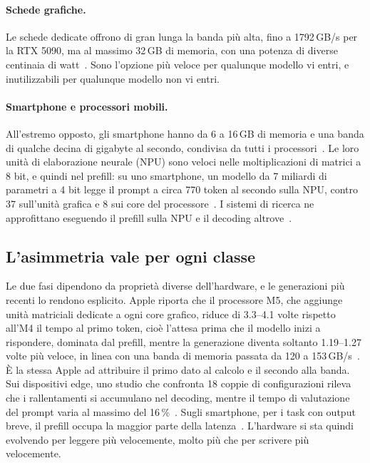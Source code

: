 \paragraph{Schede grafiche.} Le schede dedicate offrono di gran lunga la banda più alta, fino a 1792\,GB/s per la RTX
5090, ma al massimo 32\,GB di memoria, con una potenza di diverse centinaia di watt~\cite{nvidia2026geforce}. Sono
l'opzione più veloce per qualunque modello vi entri, e inutilizzabili per qualunque modello non vi entri.

\paragraph{Smartphone e processori mobili.} All'estremo opposto, gli smartphone hanno da 6 a 16\,GB di memoria e una
banda di qualche decina di gigabyte al secondo, condivisa da tutti i processori~\cite{li2025collaborative,xue2024powerinfer2}.
Le loro unità di elaborazione neurale (NPU) sono veloci nelle moltiplicazioni di matrici a 8 bit, e quindi nel prefill:
su uno smartphone, un modello da 7 miliardi di parametri a 4 bit legge il prompt a circa 770 token al secondo sulla NPU,
contro 37 sull'unità grafica e 8 sui core del processore~\cite{xue2024powerinfer2}. I sistemi di ricerca ne approfittano
eseguendo il prefill sulla NPU e il decoding altrove~\cite{xu2025npu}.

\subsection{L'asimmetria vale per ogni classe}
\label{sec:local-asymmetry}

Le due fasi dipendono da proprietà diverse dell'hardware, e le generazioni più recenti lo rendono esplicito. Apple
riporta che il processore M5, che aggiunge unità matriciali dedicate a ogni core grafico, riduce di 3.3--4.1 volte
rispetto all'M4 il tempo al primo token, cioè l'attesa prima che il modello inizi a rispondere, dominata dal prefill, mentre la generazione diventa soltanto 1.19--1.27 volte più
veloce, in linea con una banda di memoria passata da 120 a 153\,GB/s~\cite{apple2025m5mlx}. È la stessa Apple ad
attribuire il primo dato al calcolo e il secondo alla banda. Sui dispositivi edge, uno studio che confronta 18 coppie di
configurazioni rileva che i rallentamenti si accumulano nel decoding, mentre il tempo di valutazione del prompt varia al
massimo del 16\,\%~\cite{das2026edge}. Sugli smartphone, per i task con output breve, il prefill occupa la maggior parte
della latenza~\cite{xu2025npu}. L'hardware si sta quindi evolvendo per leggere più velocemente, molto più che per
scrivere più velocemente.


